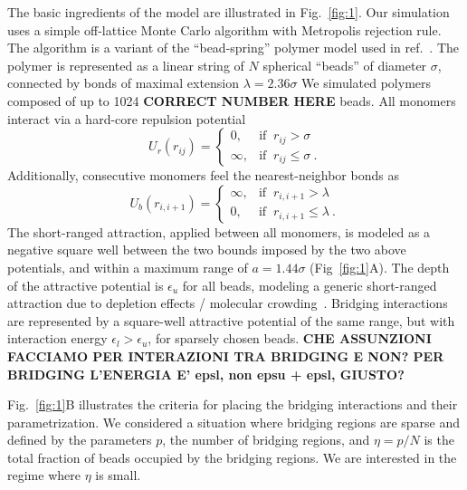 \documentclass[
preprint,
a4paper,
12pt,
superscriptaddress,
pre]{revtex4}
\begin{document}
The basic ingredients of the model are illustrated in
Fig.~\ref{fig:1}. Our simulation uses a simple off-lattice Monte Carlo
algorithm with Metropolis rejection rule. The algorithm is a variant
of the ``bead-spring'' polymer model used in
ref.~\cite{Cacciuto2006}. The polymer is represented as a linear
string of $N$ spherical ``beads'' of diameter $\sigma$, connected by
bonds of maximal extension $\lambda = 2.36 \sigma$
We simulated polymers composed of up to 1024 \textbf{CORRECT NUMBER
  HERE} beads.  All monomers interact via a hard-core repulsion
potential
\begin{displaymath}
  U_r(r_{ij}) = \begin{cases} 
    0,  & \mbox{if }\ r_{ij} > \sigma \\ 
    \infty, & \mbox{if }\ r_{ij} \leq \sigma \ . 
  \end{cases} 
\end{displaymath}
Additionally, consecutive monomers feel the nearest-neighbor bonds as 
\begin{displaymath}
  U_b(r_{i,i+1}) = \begin{cases} 
    \infty,  & \mbox{if }\ r_{i,i+1} > \lambda \\ 
    0, & \mbox{if }\ r_{i,i+1} \leq \lambda \ . 
  \end{cases} 
\end{displaymath}
The short-ranged attraction, applied between all monomers, is modeled as a
negative square well between the two bounds imposed by the two above
potentials, and within a maximum range of $a = 1.44 \sigma$
(Fig~\ref{fig:1}A). The depth of the attractive potential is
$\epsilon_u$ for all beads, modeling a generic short-ranged attraction
due to depletion effects / molecular crowding~\cite{Noro2000}.
Bridging interactions are represented by a square-well attractive
potential of the same range, but with interaction energy $\epsilon_l >
\epsilon_u$, for sparsely chosen beads.
%
\textbf{CHE ASSUNZIONI FACCIAMO PER INTERAZIONI TRA BRIDGING E NON?
  PER BRIDGING L'ENERGIA E' epsl, non epsu + epsl, GIUSTO?   }

Fig.~\ref{fig:1}B illustrates the criteria for placing the bridging
interactions and their parametrization. We considered a situation
where bridging regions are sparse and defined by the parameters $p$,
the number of bridging regions, and $\eta=p/N$ is the total fraction
of beads occupied by the bridging regions. We are interested in the
regime where $\eta$ is small. 
\end{document}
